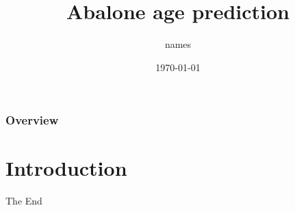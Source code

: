 \documentclass[10pt]{beamer}
\title[Abalone]
{Abalone age prediction}
\author{names} %
\institute[Uni Freiburg] %
{
Albert-Ludwigs-Universität Freiburg \\ %
\medskip
\textit{emails} %
}
\date{\today} %
\begin{document}



\begin{frame}
\titlepage %
\end{frame}

\begin{frame}
\frametitle{Overview} %
\tableofcontents %
\end{frame}


\section{Introduction}





\begin{frame}
\Huge{\centerline{The End}}
\end{frame}

\end{document}
